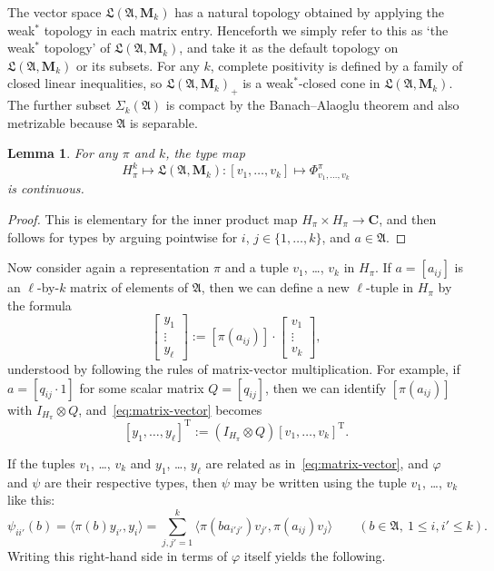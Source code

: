 \documentclass[12pt,a4paper]{article}
\numberwithin{equation}{section}
\newtheorem{lem}[thm]{Lemma}
\theoremstyle{remark}
\renewcommand{\rm}[1]{\mathrm{#1}}
\newcommand{\bbC}{\mathbf{C}}
\newcommand{\rmM}{\mathbf{M}}
\newcommand{\A}{\mathfrak{A}}
\newcommand{\frL}{\mathfrak{L}}
\renewcommand{\S}{\Sigma}
\renewcommand{\phi}{\varphi}
\begin{document}
The vector space $\frL(\A,\rmM_k)$ has a natural topology obtained by applying the weak$^\ast$ topology in each matrix entry. Henceforth we simply refer to this as `the weak$^\ast$ topology' of $\frL(\A,\rmM_k)$, and take it as the default topology on $\frL(\A,\rmM_k)$ or its subsets.  For any $k$, complete positivity is defined by a family of closed linear inequalities, so $\frL(\A,\rmM_k)_+$ is a weak$^\ast$-closed cone in $\frL(\A,\rmM_k)$.  The further subset $\S_k(\A)$ is compact by the Banach--Alaoglu theorem and also metrizable because $\A$ is separable.

\begin{lem}\label{lem:unif-cts}
	For any $\pi$ and $k$, the type map
	\[H_\pi^k \mapsto \frL(\A,\rmM_k):[v_1,\dots,v_k] \mapsto \Phi^\pi_{v_1,\dots,v_k}\]
	is continuous.
\end{lem}

\begin{proof}
	This is elementary for the inner product map $H_\pi\times H_\pi\to \bbC$, and then follows for types by arguing pointwise for $i$, $j \in \{1,\dots,k\}$, and ${a \in \A}$.
\end{proof}

Now consider again a representation $\pi$ and a tuple $v_1$, \dots, $v_k$ in $H_\pi$.  If $a = [a_{ij}]$ is an $\ell$-by-$k$ matrix of elements of $\A$, then we can define a new $\ell$-tuple in $H_\pi$ by the formula
\begin{equation}\label{eq:matrix-vector}
\left[\begin{array}{c}y_1 \\ \vdots \\ y_\ell\end{array}\right] := [\pi(a_{ij})]\cdot\left[\begin{array}{c}v_1\\ \vdots \\ v_k\end{array}\right],
\end{equation}
understood by following the rules of matrix-vector multiplication.  For example, if $a = [q_{ij}\cdot 1]$ for some scalar matrix $Q = [q_{ij}]$, then we can identify $[\pi(a_{ij})]$ with $I_{H_\pi}\otimes Q$, and~\eqref{eq:matrix-vector} becomes
\begin{equation}\label{eq:y-Q-v}
[y_1,\dots,y_\ell]^\rm{T} := (I_{H_\pi}\otimes Q)[v_1,\dots,v_k]^\rm{T}.
\end{equation}

If the tuples $v_1$, \dots, $v_k$ and $y_1$, \dots, $y_\ell$ are related as in~\eqref{eq:matrix-vector}, and $\phi$ and $\psi$ are their respective types, then $\psi$ may be written using the tuple $v_1$, \dots, $v_k$ like this:
\[\psi_{ii'}(b) = \langle \pi(b)y_{i'},y_i\rangle = \sum_{j,j'=1}^k \langle \pi(ba_{i'j'})v_{j'},\pi(a_{ij})v_j\rangle \qquad (b \in \A,\ 1\le i,i'\le k).\]
Writing this right-hand side in terms of $\phi$ itself yields the following.
\end{document}

